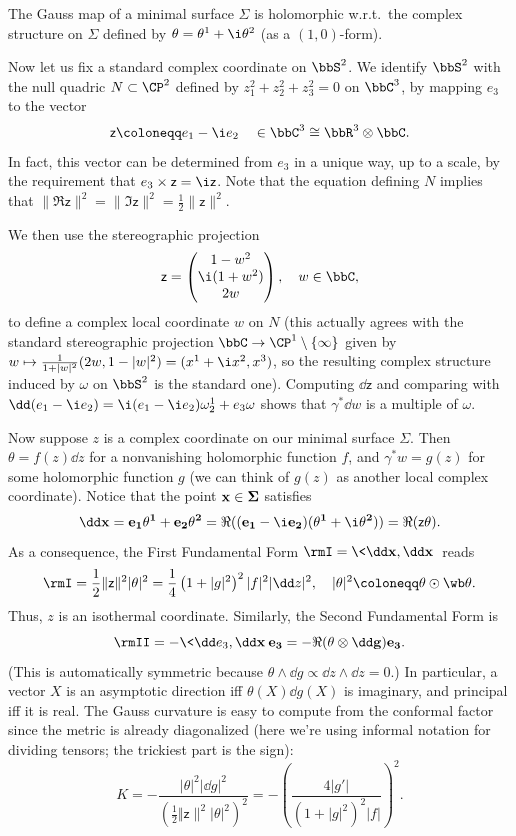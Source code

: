 \begin{cor}
    The Gauss map of a minimal surface $\Sigma$ is holomorphic w.r.t.\ the complex structure on $\Sigma$ defined by $\theta=\theta^1+\i \theta^2$ (as a $(1,0)$-form).
\end{cor}

Now let us fix a standard complex coordinate on $\bbS^2$. We identify $\bbS^2$ with the null quadric $N\subset \CP^2$ defined by $z_1^2+z_2^2+z_3^2=0$ on $\bbC^3$, by mapping $e_3$ to the vector 
\[\mathsf{z}\coloneqq e_1-\i e_2 \quad \in\bbC^3\cong \bbR^3\otimes\bbC.\]
In fact, this vector can be determined from $e_3$ in a unique way, up to a scale, by the requirement that $e_3\times \mathsf{z}=\i \mathsf{z}$. Note that the equation defining $N$ implies that $\lVert\Re \mathsf{z}\rVert^2=\lVert\Im \mathsf{z}\rVert^2=\frac12\lVert \mathsf{z}\rVert^2$.

We then use the stereographic projection 
\[\mathsf{z}=\begin{pmatrix}
    1-w^2\\ \i(1+w^2)\\ 2w
\end{pmatrix},\quad w\in\bbC,\]
to define a complex local coordinate $w$ on $N$ (this actually agrees with the standard stereographic projection $\bbC\to \CP^1\setminus\{\infty\}$ given by $w\mapsto \frac{1}{1+|w|^2}(2w,1-|w|^2)=(x^1+\i x^2,x^3)$, so the resulting complex structure induced by $\omega$ on $\bbS^2$ is the standard one). Computing $\dd\mathsf{z}$ and comparing with $\dd(e_1-\i e_2)=\i(e_1-\i e_2)\omega^1_2+e_3\omega$ shows that $\gamma^\ast\dd w$ is a multiple of $\omega$.

Now suppose $z$ is a complex coordinate on our minimal surface $\Sigma$. Then $\theta=f(z)\dd z$ for a nonvanishing holomorphic function $f$, and $\gamma^\ast w=g(z)$ for some holomorphic function $g$ (we can think of $g(z)$ as another local complex coordinate). Notice that the point $\bf{x}\in \Sigma$ satisfies 
\[\dd \bf{x}=e_1\theta^1+e_2\theta^2=\Re((e_1-\i e_2)(\theta^1+\i \theta^2))=\Re(\mathsf{z}\theta).\]
As a consequence, the First Fundamental Form $\rmI=\<\dd\bf{x},\dd\bf{x}\>$ reads 
\[\rmI=\frac12\lVert\mathsf{z}\rVert^2 |\theta|^2=\frac14 \left(1+|g|^2\right)^2 |f|^2 |\dd z|^2,\quad |\theta|^2\coloneqq \theta\odot\wb\theta.\]
Thus, $z$ is an isothermal coordinate. Similarly, the Second Fundamental Form is 
\[\rmII=-\<\dd e_3,\dd\bf{x}\>e_3=-\Re(\theta \otimes \dd g)e_3.\]
(This is automatically symmetric because $\theta\wedge\dd g\propto \dd z\wedge\dd z=0$.)
In particular, a vector $X$ is an asymptotic direction iff $\theta(X)\dd g(X)$ is imaginary, and principal iff it is real. The Gauss curvature is easy to compute from the conformal factor since the metric is already diagonalized (here we're using informal notation for dividing tensors; the trickiest part is the sign):
\[K=-\frac{|\theta|^2|\dd g|^2}{\left(\frac12\Vert \mathsf{z}\rVert^2 |\theta|^2\right)^2}=-\left(\frac{4|g'|}{(1+|g|^2)^2|f|}\right)^2.\]

